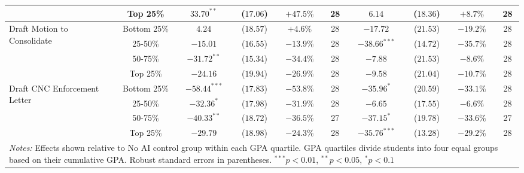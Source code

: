 \begin{table}[!htbp]
\begin{tabular}{lccccccccc}
& Top 25\% & $33.70^{**}$ & ($17.06$) & $+47.5\%$ & 28 & $6.14$ & ($18.36$) & $+8.7\%$ & 28 \\
\hline
\multirow{4}{*}{Draft Motion to Consolidate} & Bottom 25\% & $4.24$ & ($18.57$) & $+4.6\%$ & 28 & $-17.72$ & ($21.53$) & $-19.2\%$ & 28 \\
& 25-50\% & $-15.01$ & ($16.55$) & $-13.9\%$ & 28 & $-38.66^{***}$ & ($14.72$) & $-35.7\%$ & 28 \\
& 50-75\% & $-31.72^{**}$ & ($15.34$) & $-34.4\%$ & 28 & $-7.88$ & ($21.53$) & $-8.6\%$ & 28 \\
& Top 25\% & $-24.16$ & ($19.94$) & $-26.9\%$ & 28 & $-9.58$ & ($21.04$) & $-10.7\%$ & 28 \\
\hline
\multirow{4}{*}{Draft CNC Enforcement Letter} & Bottom 25\% & $-58.44^{***}$ & ($17.83$) & $-53.8\%$ & 28 & $-35.96^{*}$ & ($20.59$) & $-33.1\%$ & 28 \\
& 25-50\% & $-32.36^{*}$ & ($17.98$) & $-31.9\%$ & 28 & $-6.65$ & ($17.55$) & $-6.6\%$ & 28 \\
& 50-75\% & $-40.33^{**}$ & ($18.72$) & $-36.5\%$ & 27 & $-37.15^{*}$ & ($19.78$) & $-33.6\%$ & 27 \\
& Top 25\% & $-29.79$ & ($18.98$) & $-24.3\%$ & 28 & $-35.76^{***}$ & ($13.28$) & $-29.2\%$ & 28 \\
\hline
\multicolumn{10}{p{0.95\linewidth}}{\footnotesize \textit{Notes:} Effects shown relative to No AI control group within each GPA quartile. GPA quartiles divide students into four equal groups based on their cumulative GPA. Robust standard errors in parentheses. $^{***}p<0.01$, $^{**}p<0.05$, $^{*}p<0.1$}
\end{tabular}
\end{table}
